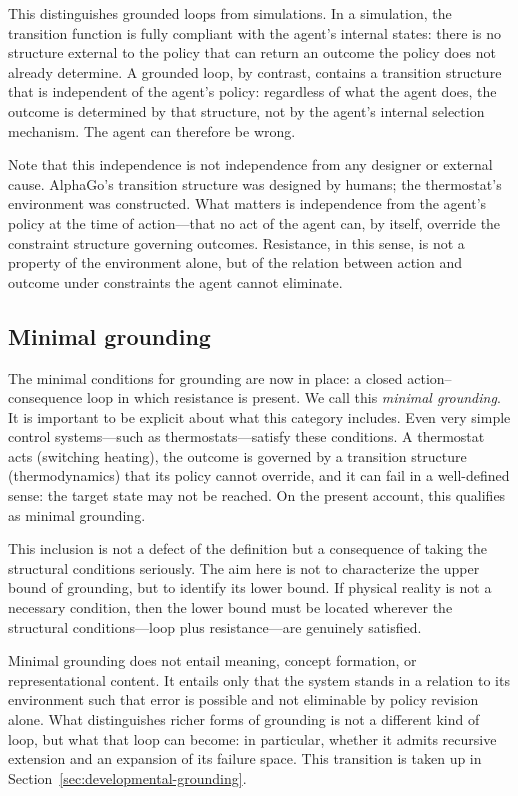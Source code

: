 \documentclass[11pt]{article}
\begin{document}
This distinguishes grounded loops from simulations. In a simulation,
the transition function is fully compliant with the agent's internal
states: there is no structure external to the policy that can return
an outcome the policy does not already determine. A grounded loop, by
contrast, contains a transition structure that is independent of the
agent's policy: regardless of what the agent does, the outcome is
determined by that structure, not by the agent's internal selection
mechanism. The agent can therefore be wrong.

Note that this independence is not independence from any designer or
external cause. AlphaGo's transition structure was designed by humans;
the thermostat's environment was constructed. What matters is
independence from the agent's policy at the time of action---that no
act of the agent can, by itself, override the constraint structure
governing outcomes. Resistance, in this sense, is not a property of
the environment alone, but of the relation between action and outcome
under constraints the agent cannot eliminate.

\subsection{Minimal grounding}
\label{sec:minimal}

The minimal conditions for grounding are now in place: a closed
action--consequence loop in which resistance is present. We call this
\emph{minimal grounding}. It is important to be explicit about what
this category includes. Even very simple control systems---such as
thermostats---satisfy these conditions. A thermostat acts (switching
heating), the outcome is governed by a transition structure
(thermodynamics) that its policy cannot override, and it can fail in a
well-defined sense: the target state may not be reached. On the
present account, this qualifies as minimal grounding.

This inclusion is not a defect of the definition but a consequence of
taking the structural conditions seriously. The aim here is not to
characterize the upper bound of grounding, but to identify its lower
bound. If physical reality is not a necessary condition, then the
lower bound must be located wherever the structural conditions---loop
plus resistance---are genuinely satisfied.

Minimal grounding does not entail meaning, concept formation, or
representational content. It entails only that the system stands in a
relation to its environment such that error is possible and not
eliminable by policy revision alone. What distinguishes richer forms
of grounding is not a different kind of loop, but what that loop can
become: in particular, whether it admits recursive extension and an
expansion of its failure space. This transition is taken up in
Section~\ref{sec:developmental-grounding}.
\end{document}
